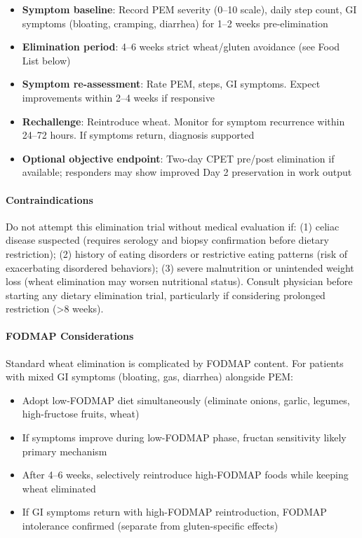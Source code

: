 \begin{itemize}
    \item \textbf{Symptom baseline}: Record PEM severity (0--10 scale), daily step count, GI symptoms (bloating, cramping, diarrhea) for 1--2 weeks pre-elimination
    \item \textbf{Elimination period}: 4--6 weeks strict wheat/gluten avoidance (see Food List below)
    \item \textbf{Symptom re-assessment}: Rate PEM, steps, GI symptoms. Expect improvements within 2--4 weeks if responsive
    \item \textbf{Rechallenge}: Reintroduce wheat. Monitor for symptom recurrence within 24--72 hours. If symptoms return, diagnosis supported
    \item \textbf{Optional objective endpoint}: Two-day CPET pre/post elimination if available; responders may show improved Day 2 preservation in work output
\end{itemize}

\paragraph{Contraindications}

Do not attempt this elimination trial without medical evaluation if: (1) celiac disease suspected (requires serology and biopsy confirmation before dietary restriction); (2) history of eating disorders or restrictive eating patterns (risk of exacerbating disordered behaviors); (3) severe malnutrition or unintended weight loss (wheat elimination may worsen nutritional status). Consult physician before starting any dietary elimination trial, particularly if considering prolonged restriction (>8 weeks).

\paragraph{FODMAP Considerations}

Standard wheat elimination is complicated by FODMAP content. For patients with mixed GI symptoms (bloating, gas, diarrhea) alongside PEM:

\begin{itemize}
    \item Adopt low-FODMAP diet simultaneously (eliminate onions, garlic, legumes, high-fructose fruits, wheat)
    \item If symptoms improve during low-FODMAP phase, fructan sensitivity likely primary mechanism
    \item After 4--6 weeks, selectively reintroduce high-FODMAP foods while keeping wheat eliminated
    \item If GI symptoms return with high-FODMAP reintroduction, FODMAP intolerance confirmed (separate from gluten-specific effects)
\end{itemize}

